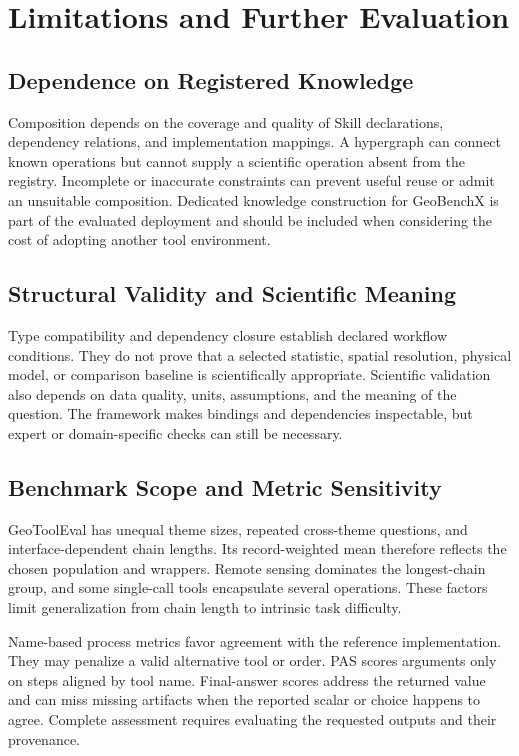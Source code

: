 \section{Limitations and Further Evaluation}
\label{app:limitations}
\subsection{Dependence on Registered Knowledge}
Composition depends on the coverage and quality of Skill declarations, dependency relations, and implementation mappings. A hypergraph can connect known operations but cannot supply a scientific operation absent from the registry. Incomplete or inaccurate constraints can prevent useful reuse or admit an unsuitable composition. Dedicated knowledge construction for GeoBenchX is part of the evaluated deployment and should be included when considering the cost of adopting another tool environment.

\subsection{Structural Validity and Scientific Meaning}
Type compatibility and dependency closure establish declared workflow conditions. They do not prove that a selected statistic, spatial resolution, physical model, or comparison baseline is scientifically appropriate. Scientific validation also depends on data quality, units, assumptions, and the meaning of the question. The framework makes bindings and dependencies inspectable, but expert or domain-specific checks can still be necessary.

\subsection{Benchmark Scope and Metric Sensitivity}
GeoToolEval has unequal theme sizes, repeated cross-theme questions, and interface-dependent chain lengths. Its record-weighted mean therefore reflects the chosen population and wrappers. Remote sensing dominates the longest-chain group, and some single-call tools encapsulate several operations. These factors limit generalization from chain length to intrinsic task difficulty.

Name-based process metrics favor agreement with the reference implementation. They may penalize a valid alternative tool or order. PAS scores arguments only on steps aligned by tool name. Final-answer scores address the returned value and can miss missing artifacts when the reported scalar or choice happens to agree. Complete assessment requires evaluating the requested outputs and their provenance.

